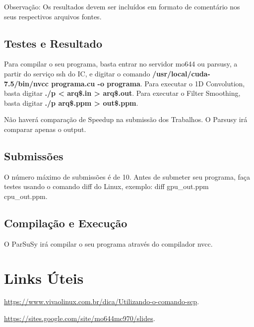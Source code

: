 \documentclass[12pt,a4paper,notitlepage]{report}
\begin{document}
Observação: Os resultados devem ser incluídos em formato de comentário nos seus respectivos arquivos fontes.

\section*{Testes e Resultado}

Para compilar o seu programa, basta entrar no servidor mo644 ou parsusy, a partir do serviço ssh do IC, e digitar o comando \textbf{/usr/local/cuda-7.5/bin/nvcc programa.cu -o programa}. Para executar o 1D Convolution, basta digitar \textbf{./p < arq\$.in > arq\$.out}. Para executar o Filter Smoothing, basta digitar  \textbf{./p arq\$.ppm > out\$.ppm}.

Não haverá comparação de Speedup na submissão dos Trabalhos. O Parsusy irá comparar apenas o output.

\section*{Submissões}

O número máximo de submissões é de 10. Antes de submeter seu programa, faça testes usando o comando diff do Linux, exemplo: diff gpu\_out.ppm cpu\_out.ppm.

\section*{Compilação e Execução}
O ParSuSy irá compilar o seu programa através do compilador nvcc.  

\chapter{Links Úteis}

\url{https://www.vivaolinux.com.br/dica/Utilizando-o-comando-scp}.

\url{https://sites.google.com/site/mo644mc970/slides}.
\end{document}
